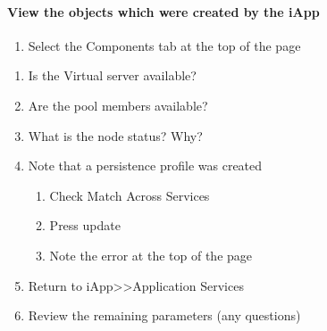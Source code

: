 \documentclass[letterpaper,10pt,english]{sphinxmanual}
\begin{document}
\paragraph{View the objects which were created by the iApp}
\label{\detokenize{class2/module1/lab1:view-the-objects-which-were-created-by-the-iapp}}\begin{enumerate}
\item {} 
Select the Components tab at the top of the page
\begin{quote}

\end{quote}

\end{enumerate}
\begin{enumerate}
\item {} 
Is the Virtual server available?

\item {} 
Are the pool members available?

\item {} 
What is the node status? Why?

\item {} 
Note that a persistence profile was created
\begin{enumerate}
\item {} 
Check Match Across Services

\item {} 
Press update

\item {} 
Note the error at the top of the page

\end{enumerate}

\item {} 
Return to iApp\textgreater{}\textgreater{}Application Services

\item {} 
Review the remaining parameters (any questions)

\end{enumerate}
\end{document}
